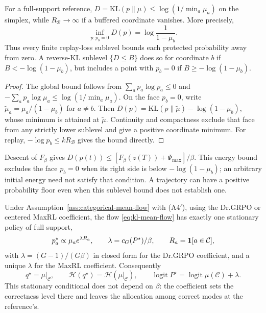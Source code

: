 \begin{lemma}
\enforcehalffinalproseline
\label{lem:kl-no-barrier}
For a full-support reference,
$D=\mathrm{KL}(p\|\mu)\le\log(1/\min_a\mu_a)$ on the simplex, while
$R_{\mathcal B}\to\infty$ if a buffered coordinate vanishes. More precisely,
\[
 \inf_{p:p_b=0}D(p)=\log\frac1{1-\mu_b}.
\]
Thus every finite replay-loss sublevel bounds each protected probability
away from zero. A reverse-KL sublevel $\{D\le B\}$ does so for coordinate $b$
if $B<-\log(1-\mu_b)$, but includes a point with $p_b=0$ if
$B\ge-\log(1-\mu_b)$.
\end{lemma}
\begin{proof}
\enforcehalffinalproseline
The global bound follows from $\sum_ap_a\log p_a\le0$ and
$-\sum_ap_a\log\mu_a\le\log(1/\min_a\mu_a)$.
On the face $p_b=0$, write $\widetilde\mu_a=\mu_a/(1-\mu_b)$ for $a\ne b$.
Then $D(p)=\mathrm{KL}(p\|\widetilde\mu)-\log(1-\mu_b)$, whose minimum is
attained at $\widetilde\mu$. Continuity and compactness exclude that face
from any strictly lower sublevel and give a positive coordinate minimum.
For replay, $-\log p_b\le kR_{\mathcal B}$ gives the bound directly.
\end{proof}

Descent of $F_\beta$ gives
$D(p(t))\le [F_\beta(z(T))+\Psi_{\max}]/\beta$.
This energy bound excludes the face $p_b=0$ when its right side is below
$-\log(1-\mu_b)$; an arbitrary initial energy need not satisfy that condition.
A trajectory can have a positive probability floor even when this sublevel
bound does not establish one.

\begin{proposition}
\enforcehalffinalproseline
\label{prop:kl-stationary}
Under Assumption~\ref{ass:categorical-mean-flow} with (A4$'$), using the
Dr.GRPO or centered MaxRL coefficient, the flow
\eqref{eq:kl-mean-flow} has exactly one stationary policy of full support,
\[
  p^\star_a\propto\mu_ae^{\lambda R_a},
  \qquad
  \lambda=c_G(P^\star)/\beta,
  \qquad
  R_a=\mathbf 1[a\in\mathcal C],
\]
with $\lambda=(G-1)/(G\beta)$ in closed form for the Dr.GRPO coefficient, and
a unique $\lambda$ for the MaxRL coefficient. Consequently
\[
  q^\star=\mu|_{\mathcal C},
  \qquad
  \mathcal H(q^\star)=\mathcal H(\mu|_{\mathcal C}),
  \qquad
  \operatorname{logit}P^\star=\operatorname{logit}\mu(\mathcal C)+\lambda .
\]
This stationary conditional does not depend on $\beta$: the coefficient sets
the correctness level there and leaves the allocation among correct modes at
the reference's.
\end{proposition}

